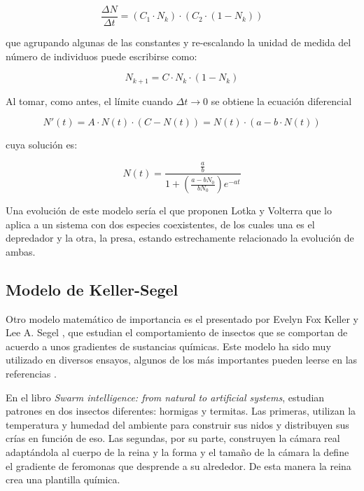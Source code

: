 \begin{equation}
    \displaystyle{\frac{\Delta N}{\Delta t} = (C_1 \cdot N_k) \cdot (C_2 \cdot (1-N_k))}
\end{equation}

\noindent que agrupando algunas de las constantes y re-escalando la unidad de medida del número de individuos puede escribirse como:

\begin{equation}
    N_{k+1} = C \cdot N_k \cdot (1 - N_k)
\end{equation}

\noindent Al tomar, como antes, el límite cuando $\Delta t\to 0$ se obtiene la ecuación diferencial 

\begin{equation}
    N'(t) = A \cdot N(t) \cdot (C-N(t)) = N(t) \cdot (a-b \cdot N(t))
\end{equation}

cuya solución es:

\begin{equation}
    \displaystyle{N(t) = \frac{\frac{a}{b}}{1+(\frac{a-bN_0}{bN_0})e^{-at}}} 
\end{equation}

Una evolución de este modelo sería el que proponen Lotka y Volterra \cite[Cap.~43]{haberman1998mathematical} que lo aplica a un sistema con  dos especies coexistentes, de los cuales una es el  depredador y la otra, la presa, estando estrechamente relacionado la evolución de ambas.


\subsection{Modelo de Keller-Segel} \label{s_2_2_2}
Otro modelo matemático de importancia es el presentado por Evelyn Fox Keller y Lee A. Segel \cite{keller1970initiation, keller1971model, keller1971traveling}, que estudian el comportamiento de insectos que se comportan de acuerdo a unos gradientes de sustancias químicas. Este modelo ha sido muy utilizado en diversos ensayos, algunos de los más importantes pueden leerse en las referencias \cite{calvez2008parabolic, blanchet2008convergence, calvez2006volume, dolbeault2004optimal, blanchet2006two, corrias2006critical}.

En el libro \textit{Swarm intelligence: from natural to artificial systems}, \citeauthor{bonabeau1999swarm} estudian patrones en dos insectos diferentes: hormigas y termitas. Las primeras, utilizan la temperatura y humedad del ambiente para construir sus nidos y distribuyen sus crías en función de eso. Las segundas, por su parte, construyen la cámara real adaptándola al cuerpo de la reina y la forma y el tamaño de la cámara la define el gradiente de feromonas que desprende a su alrededor. De esta manera la reina crea una plantilla química.

